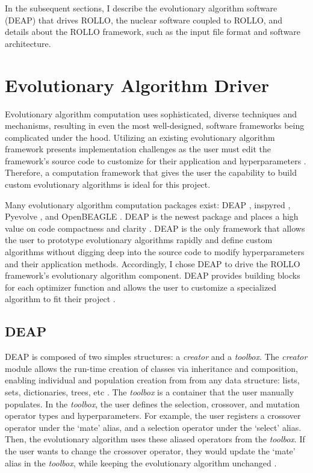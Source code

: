 In the subsequent sections, I describe the evolutionary algorithm software (DEAP)
that drives \gls{ROLLO}, the nuclear software coupled to \gls{ROLLO}, and details about 
the \gls{ROLLO} framework, such as the input file format and software architecture. 

\section{Evolutionary Algorithm Driver}
Evolutionary algorithm computation uses sophisticated, diverse techniques 
and mechanisms, resulting in even the most well-designed, software frameworks 
being complicated under the hood. 
Utilizing an existing evolutionary algorithm framework presents implementation 
challenges as the user must edit the framework's source code to customize for their 
application and hyperparameters \cite{fortin_deap_2012}. 
Therefore, a computation framework that gives the user the capability to build 
custom evolutionary algorithms is ideal for this project.

Many evolutionary algorithm computation packages exist: 
\gls{DEAP} \cite{fortin_deap_2012}, inspyred \cite{garrett_inspyred_2014}, 
Pyevolve \cite{perone_pyevolve_2009}, and OpenBEAGLE \cite{gagne_open_2002}.
\gls{DEAP} is the newest package and places a high value on code 
compactness and clarity \cite{fortin_deap_2012}. 
\gls{DEAP} is the only framework that allows the user to prototype evolutionary 
algorithms rapidly and define custom algorithms without digging deep into 
the source code to modify hyperparameters and their application methods.
Accordingly, I chose \gls{DEAP} to drive the \gls{ROLLO} framework's 
evolutionary algorithm component. 
\gls{DEAP} provides building blocks for each optimizer function and allows the 
user to customize a specialized algorithm to fit their project \cite{fortin_deap_2012}.

\subsection{\acrlong{DEAP}}
\label{sec:deap-works}
\gls{DEAP} is composed of two simples structures: a \textit{creator} and a 
\textit{toolbox}.  
The \textit{creator} module allows the run-time creation of classes via 
inheritance and composition, enabling individual and population creation from 
from any data structure: lists, sets, dictionaries, trees, etc \cite{fortin_deap_2012}. 
The \textit{toolbox} is a container that the user manually populates.
In the \textit{toolbox}, the user defines the selection, crossover, and 
mutation operator types and hyperparameters. 
For example, the user registers a crossover operator under the `mate'
alias, and a selection operator under the `select' alias. 
Then, the evolutionary algorithm uses these aliased operators from the 
\textit{toolbox}. 
If the user wants to change the crossover operator, they would update the 
`mate' alias in the \textit{toolbox}, while keeping the evolutionary algorithm 
unchanged \cite{fortin_deap_2012}. 

